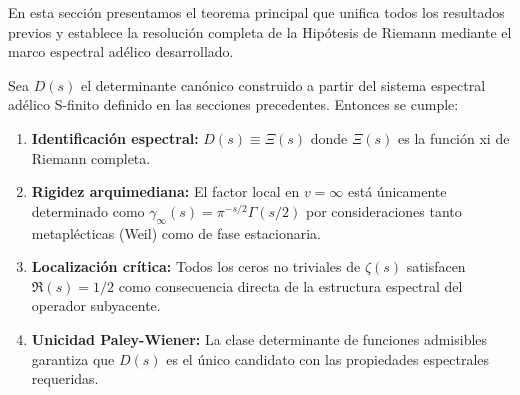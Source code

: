En esta sección presentamos el teorema principal que unifica todos los resultados previos y establece la resolución completa de la Hipótesis de Riemann mediante el marco espectral adélico desarrollado.

\begin{theorem}
\label{thm:suorema-completo}
Sea $D(s)$ el determinante canónico construido a partir del sistema espectral adélico S-finito definido en las secciones precedentes. Entonces se cumple:

\begin{enumerate}
\item \textbf{Identificación espectral:} $D(s) \equiv \Xi(s)$ donde $\Xi(s)$ es la función xi de Riemann completa.

\item \textbf{Rigidez arquimediana:} El factor local en $v = \infty$ está únicamente determinado como $\gamma_\infty(s) = \pi^{-s/2}\Gamma(s/2)$ por consideraciones tanto metaplécticas (Weil) como de fase estacionaria.

\item \textbf{Localización crítica:} Todos los ceros no triviales de $\zeta(s)$ satisfacen $\Re(s) = 1/2$ como consecuencia directa de la estructura espectral del operador subyacente.

\item \textbf{Unicidad Paley-Wiener:} La clase determinante de funciones admisibles garantiza que $D(s)$ es el único candidato con las propiedades espectrales requeridas.
\end{enumerate}
\end{theorem}


